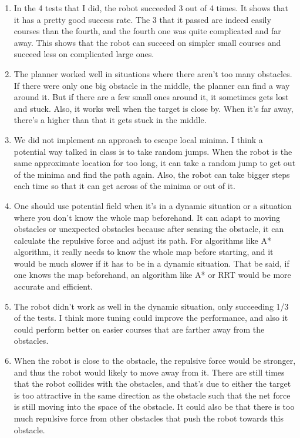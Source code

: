 \documentclass{article}
\begin{document}
\begin{enumerate}
    \item In the 4 tests that I did, the robot succeeded 3 out of 4 times. It shows that it has a pretty good success rate. The 3 that it passed are indeed easily courses than the fourth, and the fourth one was quite complicated and far away. This shows that the robot can succeed on simpler small courses and succeed less on complicated large ones.

    \item The planner worked well in situations where there aren't too many obstacles. If there were only one big obstacle in the middle, the planner can find a way around it. But if there are a few small ones around it, it sometimes gets lost and stuck. Also, it works well when the target is close by. When it's far away, there's a higher than that it gets stuck in the middle.
    
    \item We did not implement an approach to escape local minima. I think a potential way talked in class is to take random jumps. When the robot is the same approximate location for too long, it can take a random jump to get out of the minima and find the path again. Also, the robot can take bigger steps each time so that it can get across of the minima or out of it.
    
    \item One should use potential field when it's in a dynamic situation or a situation where you don't know the whole map beforehand. It can adapt to moving obstacles or unexpected obstacles because after sensing the obstacle, it can calculate the repulsive force and adjust its path. For algorithms like A* algorithm, it really needs to know the whole map before starting, and it would be much slower if it has to be in a dynamic situation. That be said, if one knows the map beforehand, an algorithm like A* or RRT would be more accurate and efficient. 
    
    \item The robot didn't work as well in the dynamic situation, only succeeding 1/3 of the tests. I think more tuning could improve the performance, and also it could perform better on easier courses that are farther away from the obstacles.
    
    \item When the robot is close to the obstacle, the repulsive force would be stronger, and thus the robot would likely to move away from it. There are still times that the robot collides with the obstacles, and that's due to either the target is too attractive in the same direction as the obstacle such that the net force is still moving into the space of the obstacle. It could also be that there is too much repulsive force from other obstacles that push the robot towards this obstacle.
    

\end{enumerate}
\end{document}
